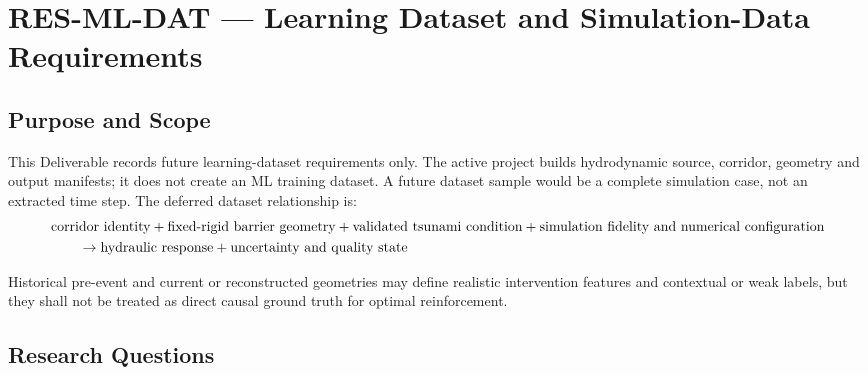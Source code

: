 
\section{RES-ML-DAT --- Learning Dataset and Simulation-Data Requirements}
\label{sec:res-ml-dat}

\subsection{Purpose and Scope}
\label{sec:res-ml-dat-purpose}

This Deliverable records future learning-dataset requirements only.
The active project builds hydrodynamic source, corridor, geometry and
output manifests; it does not create an ML training dataset. A future
dataset sample would be a complete simulation case, not an extracted
time step. The deferred dataset relationship is:
\begin{align}
  &\text{corridor identity}
  + \text{fixed-rigid barrier geometry}
  + \text{validated tsunami condition}
  + \text{simulation fidelity and numerical configuration}
  \notag\\
  &\qquad \rightarrow
  \text{hydraulic response}
  + \text{uncertainty and quality state}
  \label{eq:res-ml-dat-sample-definition}
\end{align}

Historical pre-event and current or reconstructed geometries may define
realistic intervention features and contextual or weak labels, but they shall
not be treated as direct causal ground truth for optimal reinforcement.

\subsection{Research Questions}
\label{sec:res-ml-dat-research-questions}


